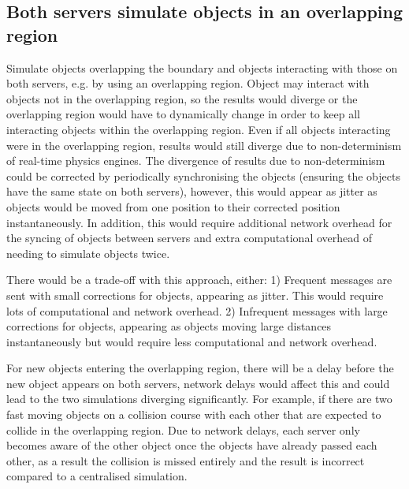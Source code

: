 \subsection{Both servers simulate objects in an overlapping region}
Simulate objects overlapping the boundary and objects interacting with those on both servers, e.g. by using an overlapping region. Object may interact with objects not in the overlapping region, so the results would diverge or the overlapping region would have to dynamically change in order to keep all interacting objects within the overlapping region. Even if all objects interacting were in the overlapping region, results would still diverge due to non-determinism of real-time physics engines. The divergence of results due to non-determinism could be corrected by periodically synchronising the objects (ensuring the objects have the same state on both servers), however, this would appear as jitter as objects would be moved from one position to their corrected position instantaneously. In addition, this would require additional network overhead for the syncing of objects between servers and extra computational overhead of needing to simulate objects twice.

There would be a trade-off with this approach, either:
1) Frequent messages are sent with small corrections for objects, appearing as jitter. This would require lots of computational and network overhead. 
2) Infrequent messages with large corrections for objects, appearing as objects moving large distances instantaneously but would require less computational and network overhead.

For new objects entering the overlapping region, there will be a delay before the new object appears on both servers, network delays would affect this and could lead to the two simulations diverging significantly. For example, if there are two fast moving objects on a collision course with each other that are expected to collide in the overlapping region. Due to network delays, each server only becomes aware of the other object once the objects have already passed each other, as a result the collision is missed entirely and the result is incorrect compared to a centralised simulation.


